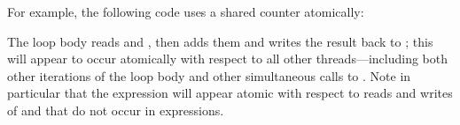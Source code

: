 For example,
the following code uses a shared counter atomically:

The loop body reads  and , then adds them and
writes the result back to ; this will appear to occur
atomically with respect to all other threads---including both other
iterations of the loop body and other simultaneous calls to
.  Note in particular that the  expression
will appear atomic with respect to reads and writes of  and  that do  not occur in
 expressions.
